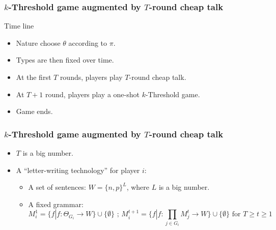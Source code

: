 \documentclass[8pt]{beamer}
\begin{document}
\begin{frame}
  \frametitle{$k$-Threshold game augmented by $T$-round cheap talk}

Time line
\begin{itemize}

\item Nature choose $\theta$ according to $\pi$.
\item Types are then fixed over time.
\item At the first $T$ rounds, players play $T$-round cheap talk.
\item At $T+1$ round, players play a one-shot $k$-Threshold game.
\item Game ends.
\end{itemize}

\end{frame}






\begin{frame}
  \frametitle{$k$-Threshold game augmented by $T$-round cheap talk}

\begin{itemize}
\item $T$ is a big number.
\item A ``letter-writing technology'' for player $i$:
\begin{itemize}
\item A set of sentences: $W=\{n,p\}^L$, where $L$ is a big number.
\item A fixed grammar: 
\[M^1_i=\{f|f:\Theta_{G_i}\rightarrow W\}\cup\{\emptyset\} \text{ ; } M^{t+1}_i=\{f|f:\prod_{j\in G_i}M^{t}_j\rightarrow W\}\cup\{\emptyset\} \text{ for }T\geq t\geq 1\]
\end{itemize}

\end{itemize}

\end{frame}
\end{document}
